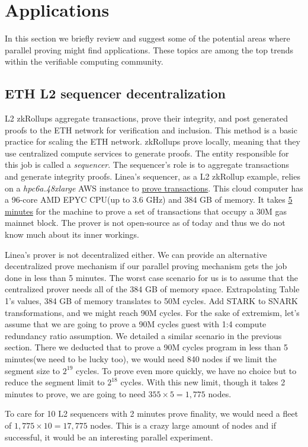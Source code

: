 \documentclass[a4paper, 10pt]{article}
\begin{document}
\section{Applications}
In this section we briefly review and suggest some of the potential areas where parallel proving might find applications. These topics are among the top trends within the verifiable computing community.

\subsection{ETH L2 sequencer decentralization}
L2 zkRollups aggregate transactions, prove their integrity, and post generated proofs to the ETH network for verification and inclusion. This method is a basic practice for scaling the ETH network. zkRollups prove locally, meaning that they use centralized compute services to generate proofs. The entity responsible for this job is called a \textit{sequencer}. The sequencer's role is to aggregate transactions and generate integrity proofs. Linea's sequencer, as a L2 zkRollup example, relies on a \textit{hpc6a.48xlarge} AWS instance to \href{https://ethresear.ch/t/vortex-building-a-prover-for-the-zk-evm/14427}{prove transactions}. This cloud computer has a 96-core AMD EPYC CPU(up to 3.6 GHz) and 384 GB of memory. It takes \underline{5 minutes} for the machine to prove a set of transactions that occupy a 30M gas mainnet block. The prover is not open-source as of today and thus we do not know much about its inner workings.
\par
Linea's prover is not decentralized either. We can provide an alternative decentralized prove mechanism if our parallel proving mechanism gets the job done in less than 5 minutes. The worst case scenario for us is to assume that the centralized prover needs all of the 384 GB of memory space. Extrapolating Table 1's values, 384 GB of memory translates to 50M cycles. Add STARK to SNARK transformations, and we might reach 90M cycles. For the sake of extremism, let's assume that we are going to prove a 90M cycles guest with 1:4 compute redundancy ratio assumption. We detailed a similar scenario in the previous section. There we deducted that to prove a 90M cycles program in less than 5 minutes(we need to be lucky too), we would need 840 nodes if we limit the segment size to $2^{19}$ cycles. To prove even more quickly, we have no choice but to reduce the segment limit to $2^{18}$ cycles. With this new limit, though it takes 2 minutes to prove, we are going to need $355 \times 5 = 1,775$ nodes.
\par
To care for 10 L2 sequencers with 2 minutes prove finality, we would need a fleet of $1,775 \times 10 = 17,775$ nodes. This is a crazy large amount of nodes and if successful, it would be an interesting parallel experiment.
\end{document}
